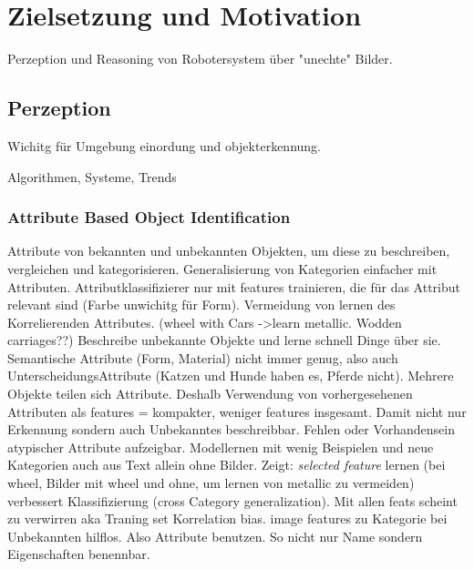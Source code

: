 \graphicspath{{./images/}}      
\def\CHAPTERONE{./chapters/Chapter-1} 

\chapter{Zielsetzung und Motivation}
\label{chap:motivation}
%	


Perzeption und Reasoning von Robotersystem über "unechte" Bilder.

\section{Perzeption}

Wichitg für Umgebung einordung und objekterkennung. 

Algorithmen, Systeme, Trends \par

\subsection{Attribute Based Object Identification}

\cite{descObjbyAtr} \newline
Attribute von bekannten und unbekannten Objekten, um diese zu beschreiben, vergleichen und kategorisieren. Generalisierung von Kategorien einfacher mit Attributen. Attributklassifizierer nur mit features trainieren, die für das Attribut relevant sind (Farbe unwichitg für Form). Vermeidung von lernen des Korrelierenden Attributes. (wheel with Cars ->learn metallic. Wodden carriages??)\newline
Beschreibe unbekannte Objekte und lerne schnell Dinge über sie. \newline 
Semantische Attribute (Form, Material) nicht immer genug, also auch UnterscheidungsAttribute (Katzen und Hunde haben es, Pferde nicht).\newline
Mehrere Objekte teilen sich Attribute. Deshalb Verwendung von vorhergesehenen Attributen als features = kompakter, weniger features insgesamt. Damit nicht nur Erkennung sondern auch Unbekanntes beschreibbar. Fehlen oder Vorhandensein atypischer Attribute aufzeigbar. Modellernen mit wenig Beispielen und neue Kategorien auch aus Text allein ohne Bilder. \newline
Zeigt: \textit{selected feature} lernen (bei wheel, Bilder mit wheel und ohne, um lernen von metallic zu vermeiden) verbessert Klassifizierung (cross Category generalization). Mit allen feats scheint zu verwirren aka Traning set Korrelation bias. \newline
image features zu Kategorie bei Unbekannten hilflos. Also Attribute benutzen. So nicht nur Name sondern Eigenschaften benennbar.

